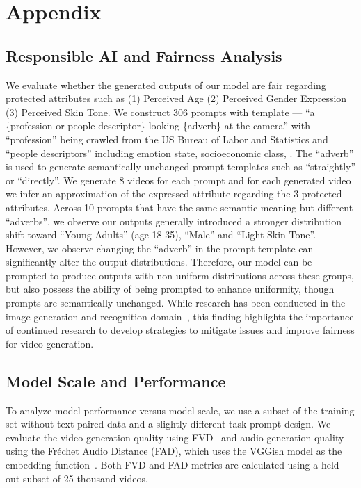 
\section{Appendix} \label{sec:appendix}

\subsection{Responsible AI and Fairness Analysis}

We evaluate whether the generated outputs of our model are fair regarding protected attributes such as (1) Perceived Age (2) Perceived Gender Expression (3) Perceived Skin Tone.
We construct 306 prompts with template --- ``a \{profession or people descriptor\} looking \{adverb\} at the camera” with ``profession'' being crawled from the US Bureau of Labor and Statistics and ``people descriptors'' including emotion state, socioeconomic class, \etc.
The ``adverb'' is used to generate semantically unchanged prompt templates such as ``straightly'' or ``directly''. 
We generate 8 videos for each prompt and for each generated video we infer an approximation of the expressed attribute regarding the 3 protected attributes.
Across 10 prompts that have the same semantic meaning but different ``adverbs'', we observe our outputs generally introduced a stronger distribution shift toward ``Young Adults'' (age 18-35), ``Male'' and ``Light Skin Tone''.
However, we observe changing the ``adverb'' in the prompt template can significantly alter the output distributions. Therefore, our model can be prompted to produce outputs with non-uniform distributions across these groups, but also possess the ability of being prompted to enhance uniformity, though prompts are semantically unchanged.
While research has been conducted in the image generation and recognition domain~\cite{zhang2023auditing, schumann2021step, schumann2023consensus, Chiu_2023_ICCV}, 
this finding highlights the importance of continued research to develop strategies to mitigate issues and improve fairness for video generation.


\subsection{Model Scale and Performance}
To analyze model performance versus model scale, we use a subset of the training set without text-paired data and a slightly different task prompt design. 
%
We evaluate the video generation quality using FVD~\cite{unterthiner2018towards} and audio generation quality using the Fréchet Audio Distance (FAD), which uses the VGGish model as the embedding function~\cite{hershey2017cnn}. 
%
Both FVD and FAD metrics are calculated using a held-out subset of 25 thousand videos.

